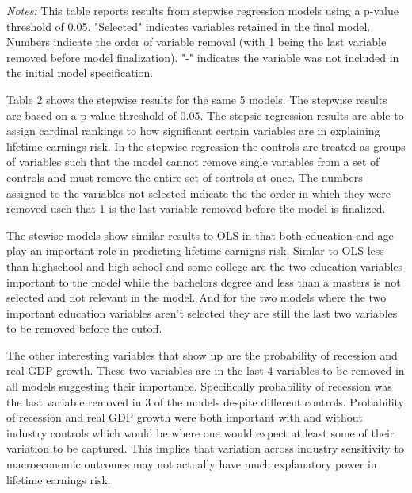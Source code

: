 \documentclass[12pt]{article}
\begin{document}
\begin{table}[H]
\begin{tabular}{lccccc}
\bottomrule
\end{tabular}%
\newline

\footnotesize
\textit{Notes:} This table reports results from stepwise regression models using a p-value threshold of 0.05. "Selected" indicates variables retained in the final model. Numbers indicate the order of variable removal (with 1 being the last variable removed before model finalization). "-" indicates the variable was not included in the initial model specification.

\end{table}


\begin{onehalfspace}


Table 2 shows the stepwise results for the same 5 models. The stepwise results are based on a p-value threshold of 0.05. The stepsie regression results are able to assign cardinal rankings to how significant certain variables are in explaining lifetime earnings risk. In the stepwise regression the controls are treated as groups of variables such that the model cannot remove single variables from a set of controls and must remove the entire set of controls at once. The numbers assigned to the variables not selected indicate the the order in which they were removed usch that 1 is the last variable removed before the model is finalized.

The stewise models show similar results to OLS in that both education and age play an important role in predicting lifetime earnigns risk. Simlar to OLS less than highschool and high school and some college are the two education variables important to the model while the bachelors degree and less than a masters is not selected and not relevant in the model. And for the two models where the two important education variables aren't selected they are still the last two variables to be removed before the cutoff. 

The other interesting variables that show up are the probability of recession and real GDP growth. These two variables are in the last 4 variables to be removed in all models suggesting their importance. Specifically probability of recession was the last variable removed in 3 of the models despite different controls. Probability of recession and real GDP growth were both important with and without industry controls which would be where one would expect at least some of their variation to be captured. This implies that variation across industry sensitivity to macroeconomic outcomes may not actually have much explanatory power in lifetime earnings risk.


\end{onehalfspace}
\end{document}
